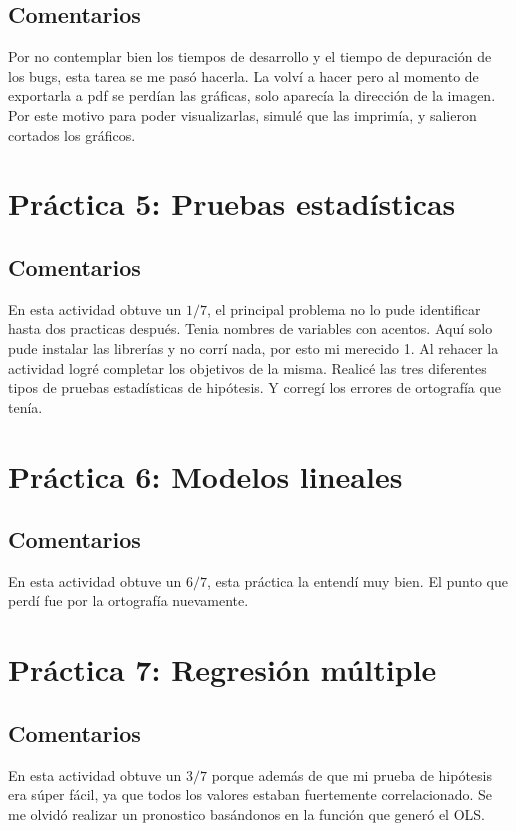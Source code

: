 \documentclass[12pt, letter]{report}
\begin{document}
\section*{Comentarios}
Por no contemplar bien los tiempos de desarrollo y el tiempo de depuración de los bugs, esta tarea se me pasó hacerla. La volví a hacer pero al momento de exportarla a pdf se perdían las gráficas, solo aparecía la dirección de la imagen. Por este motivo para poder visualizarlas, simulé que las imprimía, y salieron cortados los gráficos.


\chapter*{Práctica 5: Pruebas estadísticas}

\section*{Comentarios}
En esta actividad obtuve un $1/7$, el principal problema no lo pude identificar hasta dos practicas después. Tenia nombres de variables con acentos. Aquí solo pude instalar las librerías y no corrí nada, por esto mi merecido 1. Al rehacer la actividad logré completar los objetivos de la misma. Realicé las tres diferentes tipos de pruebas estadísticas de hipótesis. Y corregí los errores de ortografía que tenía. 


\chapter*{Práctica 6: Modelos lineales}

\section*{Comentarios}
En esta actividad obtuve un $6/7$, esta práctica la entendí muy bien. El punto que perdí fue por la ortografía nuevamente. 


\chapter*{Práctica 7: Regresión múltiple}

\section*{Comentarios}
En esta actividad obtuve un $3/7$ porque además de que mi prueba de hipótesis era súper fácil, ya que todos los valores estaban fuertemente correlacionado. Se me olvidó realizar un pronostico basándonos en la función que generó el OLS.

\end{document}
